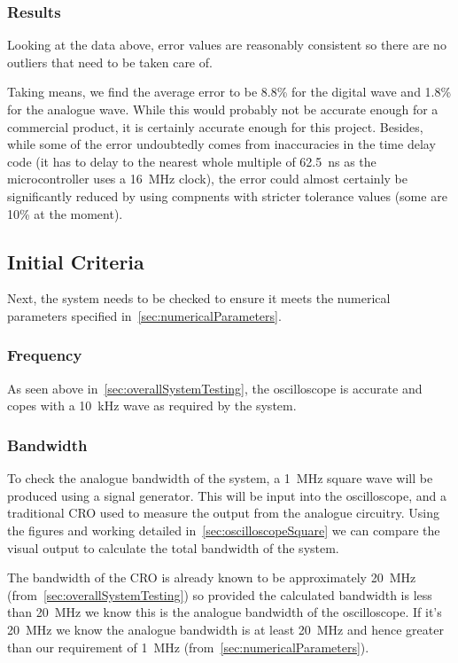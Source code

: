 \subsubsection{Results}

Looking at the data above, error values are reasonably consistent so there are
no outliers that need to be taken care of.

Taking means, we find the average error to be 8.8\% for the digital wave and 1.8\%
for the analogue wave. While this would probably not be accurate enough for a
commercial product, it is certainly accurate enough for this project. Besides,
while some of the error undoubtedly comes from inaccuracies in the time delay
code (it has to delay to the nearest whole multiple of \SI{62.5}{\ns} as the
microcontroller uses a \SI{16}{\MHz} clock), the error could almost certainly be
significantly reduced by using compnents with stricter tolerance values (some
are 10\% at the moment).

\subsection{Initial Criteria}
\label{sec:initialCriteriaMet}

Next, the system needs to be checked to ensure it meets the numerical parameters
specified in~\cref{sec:numericalParameters}.

\subsubsection*{Frequency}
As seen above in~\cref{sec:overallSystemTesting}, the oscilloscope is accurate
and copes with a \SI{10}{\kHz} wave as required by the system.

\subsubsection*{Bandwidth}
To check the analogue bandwidth of the system, a \SI{1}{\MHz} square wave will be
produced using a signal generator. This will be input into the oscilloscope,
and a traditional CRO used to measure the output from the analogue circuitry.
Using the figures and working detailed in~\cref{sec:oscilloscopeSquare} we can
compare the visual output to calculate the total bandwidth of the system.

The bandwidth of the CRO is already known to be approximately \SI{20}{\MHz}
(from~\cref{sec:overallSystemTesting}) so provided the calculated bandwidth is
less than \SI{20}{\MHz} we know this is the analogue bandwidth of the
oscilloscope. If it's \SI{20}{\MHz} we know the analogue bandwidth is at least
\SI{20}{\MHz} and hence greater than our requirement of \SI{1}{\MHz}
(from~\cref{sec:numericalParameters}).

